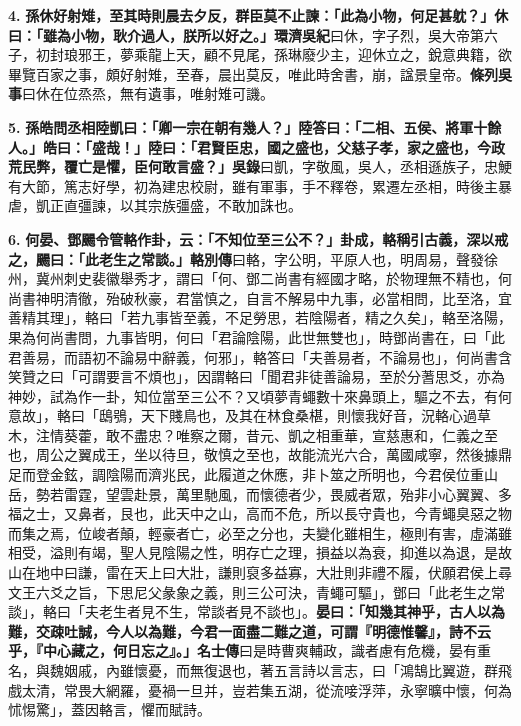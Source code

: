 \textbf{4.} \textbf{孫休好射雉，至其時則晨去夕反，群臣莫不止諫：「此為小物，何足甚躭？」休曰：「雖為小物，耿介過人，朕所以好之。」}{\footnotesize \textbf{環濟吳紀}曰休，字子烈，吳大帝第六子，初封琅邪王，夢乘龍上天，顧不見尾，孫琳廢少主，迎休立之，銳意典籍，欲畢覽百家之事，頗好射雉，至春，晨出莫反，唯此時舍書，崩，諡景皇帝。\textbf{條列吳事}曰休在位烝烝，無有遺事，唯射雉可譏。}

\textbf{5.} \textbf{孫皓問丞相陸凱曰：「卿一宗在朝有幾人？」陸答曰：「二相、五侯、將軍十餘人。」皓曰：「盛哉！」陸曰：「君賢臣忠，國之盛也，父慈子孝，家之盛也，今政荒民弊，覆亡是懼，臣何敢言盛？」}{\footnotesize \textbf{吳錄}曰凱，字敬風，吳人，丞相遜族子，忠鯁有大節，篤志好學，初為建忠校尉，雖有軍事，手不釋卷，累遷左丞相，時後主暴虐，凱正直彊諫，以其宗族彊盛，不敢加誅也。}

\textbf{6.} \textbf{何晏、鄧颺令管輅作卦，云：「不知位至三公不？」卦成，輅稱引古義，深以戒之，颺曰：「此老生之常談。」}{\footnotesize \textbf{輅別傳}曰輅，字公明，平原人也，明周易，聲發徐州，冀州刺史裴徽舉秀才，謂曰「何、鄧二尚書有經國才略，於物理無不精也，何尚書神明清徹，殆破秋豪，君當慎之，自言不解易中九事，必當相問，比至洛，宜善精其理」，輅曰「若九事皆至義，不足勞思，若陰陽者，精之久矣」，輅至洛陽，果為何尚書問，九事皆明，何曰「君論陰陽，此世無雙也」，時鄧尚書在，曰「此君善易，而語初不論易中辭義，何邪」，輅答曰「夫善易者，不論易也」，何尚書含笑贊之曰「可謂要言不煩也」，因謂輅曰「聞君非徒善論易，至於分蓍思爻，亦為神妙，試為作一卦，知位當至三公不？又頃夢青蠅數十來鼻頭上，驅之不去，有何意故」，輅曰「鴟鴞，天下賤鳥也，及其在林食桑椹，則懷我好音，況輅心過草木，注情葵藿，敢不盡忠？唯察之爾，昔元、凱之相重華，宣慈惠和，仁義之至也，周公之翼成王，坐以待旦，敬慎之至也，故能流光六合，萬國咸寧，然後據鼎足而登金鉉，調陰陽而濟兆民，此履道之休應，非卜筮之所明也，今君侯位重山岳，勢若雷霆，望雲赴景，萬里馳風，而懷德者少，畏威者眾，殆非小心翼翼、多福之士，又鼻者，艮也，此天中之山，高而不危，所以長守貴也，今青蠅臭惡之物而集之焉，位峻者顛，輕豪者亡，必至之分也，夫變化雖相生，極則有害，虛滿雖相受，溢則有竭，聖人見陰陽之性，明存亡之理，損益以為衰，抑進以為退，是故山在地中曰謙，雷在天上曰大壯，謙則裒多益寡，大壯則非禮不履，伏願君侯上尋文王六爻之旨，下思尼父彖象之義，則三公可決，青蠅可驅」，鄧曰「此老生之常談」，輅曰「夫老生者見不生，常談者見不談也」。}\textbf{晏曰：「知幾其神乎，古人以為難，交疎吐誠，今人以為難，今君一面盡二難之道，可謂『明德惟馨』，詩不云乎，『中心藏之，何日忘之』。」}{\footnotesize \textbf{名士傳}曰是時曹爽輔政，識者慮有危機，晏有重名，與魏姻戚，內雖懷憂，而無復退也，著五言詩以言志，曰「鴻鵠比翼遊，群飛戲太清，常畏大網羅，憂禍一旦并，豈若集五湖，從流唼浮萍，永寧曠中懷，何為怵惕驚」，蓋因輅言，懼而賦詩。}

